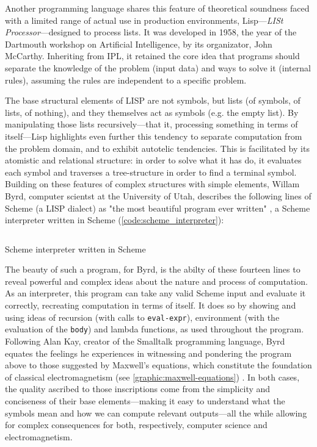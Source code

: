 Another programming language shares this feature of theoretical soundness faced with a limited range of actual use in production environments, Lisp—\emph{LISt Processor}—designed to process lists. It was developed in 1958, the year of the Dartmouth workshop on Artificial Intelligence, by its organizator, John McCarthy. Inheriting from IPL, it retained the core idea that programs should separate the knowledge of the problem (input data) and ways to solve it (internal rules), assuming  the rules are independent to a specific problem.

The base structural elements of LISP are not symbols, but lists (of symbols, of lists, of nothing), and they themselves act as symbols (e.g. the empty list). By manipulating those lists recursively—that it, processing something in terms of itself—Lisp highlights even further this tendency to separate computation from the problem domain, and to exhibit autotelic tendencies. This is facilitated by its atomistic and relational structure: in order to solve what it has do, it evaluates each symbol and traverses a tree-structure in order to find a terminal symbol. Building on these features of complex structures with simple elements, Willam Byrd, computer scientst at the University of Utah, describes the following lines of Scheme (a LISP dialect) as "the most beautiful program ever written" \citep{byrd_william_2017}, a Scheme interpreter written in Scheme (\ref{code:scheme_interpreter}):

\begin{listing}
  \inputminted{scheme}{./corpus/interpreter.scheme}
  \caption{Scheme interpreter written in Scheme}
  \label{code:scheme_interpreter}
\end{listing}

The beauty of such a program, for Byrd, is the abilty of these fourteen lines to reveal powerful and complex ideas about the nature and process of computation. As an interpreter, this program can take any valid Scheme input and evaluate it correctly, recreating computation in terms of itself. It does so by showing and using ideas of recursion (with calls to \lstinline{eval-expr}), environment (with the evaluation of the \lstinline{body}) and lambda functions, as used throughout the program. Following Alan Kay, creator of the Smalltalk programming language, Byrd equates the feelings he experiences in witnessing and pondering the program above to those suggested by Maxwell's equations, which constitute the foundation of classical electromagnetism (see \ref{graphic:maxwell-equations}) \citep{kay_conversation_2004}. In both cases, the quality ascribed to those inscriptions come from the simplicity and conciseness of their base elements—making it easy to understand what the symbols mean and how we can compute relevant outputs—all the while allowing for complex consequences for both, respectively, computer science and electromagnetism.

